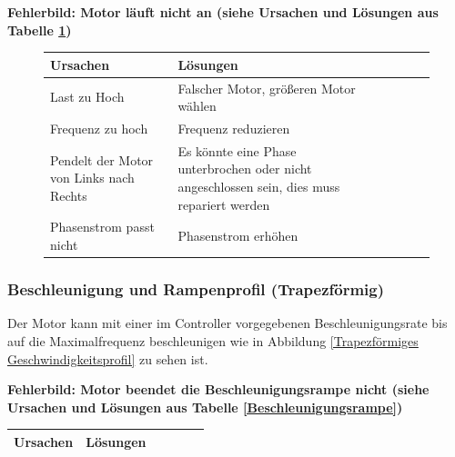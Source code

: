 

{\textbf{Fehlerbild: Motor läuft nicht an (siehe Ursachen und Lösungen aus Tabelle \ref{MOTLNA})} 
	\begin{figure}
		\begin{center}
			\fontsize{8}{10}\selectfont
			\begin{tabularx}{\textwidth}{|X|X|X|X|X|X|}
				\hline 
				\textbf{Ursachen} & \textbf{Lösungen} \\ \hline
				Last zu Hoch & Falscher Motor, größeren Motor wählen \\ \hline
				Frequenz zu hoch & Frequenz reduzieren\\ \hline
				Pendelt der Motor von Links nach Rechts & Es könnte eine Phase unterbrochen oder nicht angeschlossen sein, dies muss repariert werden \\ \hline
				Phasenstrom passt nicht & Phasenstrom erhöhen\\ \hline
				
			\end{tabularx}
			 \label{MOTLNA} 
		\end{center}
	\end{figure}
	
	
	\subsubsection{Beschleunigung und Rampenprofil (Trapezförmig)}
	
	Der Motor kann mit einer im Controller vorgegebenen Beschleunigungsrate bis auf die Maximalfrequenz beschleunigen wie in Abbildung \ref{Trapezförmiges Geschwindigkeitsprofil} zu sehen ist.\cite{Faulhaber:2020} 
	
	
	
	
	
	{\textbf{Fehlerbild: Motor beendet die Beschleunigungsrampe nicht (siehe Ursachen und Lösungen aus Tabelle \ref{Beschleunigungsrampe})}
		\begin{center}
			\fontsize{8}{10}\selectfont
			\begin{tabularx}{\textwidth}{|X|X|X|X|X|X|}
				\hline 
				\textbf{Ursachen} & \textbf{Lösungen} \\ \hline
				

\end{tabularx}
\end{center}}}
